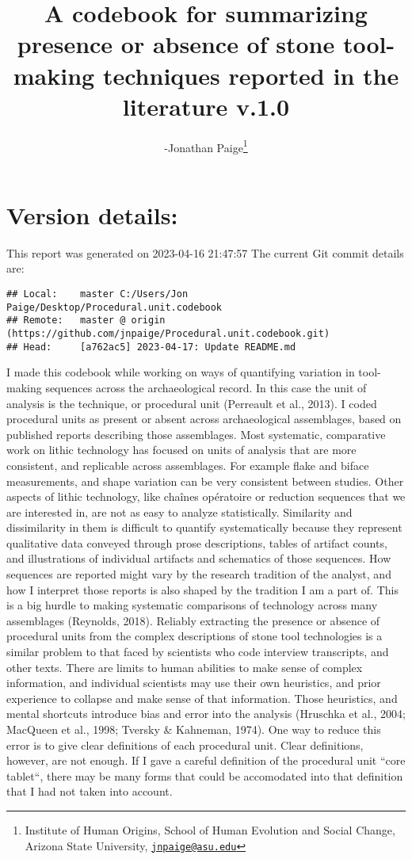\documentclass[
]{article}
\title{A codebook for summarizing presence or absence of stone
tool-making techniques reported in the literature v.1.0}
\author{-Jonathan Paige\footnote{Institute of Human Origins, School of
  Human Evolution and Social Change, Arizona State University,
  \href{mailto:jnpaige@asu.edu}{\nolinkurl{jnpaige@asu.edu}}}}
\date{}
\begin{document}
\maketitle

{
\setcounter{tocdepth}{3}
\tableofcontents
}
\hypertarget{version-details}{%
\section{Version details:}\label{version-details}}

This report was generated on 2023-04-16 21:47:57 The current Git commit
details are:

\begin{verbatim}
## Local:    master C:/Users/Jon Paige/Desktop/Procedural.unit.codebook
## Remote:   master @ origin (https://github.com/jnpaige/Procedural.unit.codebook.git)
## Head:     [a762ac5] 2023-04-17: Update README.md
\end{verbatim}

I made this codebook while working on ways of quantifying variation in
tool-making sequences across the archaeological record. In this case the
unit of analysis is the technique, or procedural unit (Perreault et al.,
2013). I coded procedural units as present or absent across
archaeological assemblages, based on published reports describing those
assemblages. Most systematic, comparative work on lithic technology has
focused on units of analysis that are more consistent, and replicable
across assemblages. For example flake and biface measurements, and shape
variation can be very consistent between studies. Other aspects of
lithic technology, like chaînes opératoire or reduction sequences that
we are interested in, are not as easy to analyze statistically.
Similarity and dissimilarity in them is difficult to quantify
systematically because they represent qualitative data conveyed through
prose descriptions, tables of artifact counts, and illustrations of
individual artifacts and schematics of those sequences. How sequences
are reported might vary by the research tradition of the analyst, and
how I interpret those reports is also shaped by the tradition I am a
part of. This is a big hurdle to making systematic comparisons of
technology across many assemblages (Reynolds, 2018). Reliably extracting
the presence or absence of procedural units from the complex
descriptions of stone tool technologies is a similar problem to that
faced by scientists who code interview transcripts, and other texts.
There are limits to human abilities to make sense of complex
information, and individual scientists may use their own heuristics, and
prior experience to collapse and make sense of that information. Those
heuristics, and mental shortcuts introduce bias and error into the
analysis (Hruschka et al., 2004; MacQueen et al., 1998; Tversky \&
Kahneman, 1974). One way to reduce this error is to give clear
definitions of each procedural unit. Clear definitions, however, are not
enough. If I gave a careful definition of the procedural unit ``core
tablet``, there may be many forms that could be accomodated into that
definition that I had not taken into account.
\end{document}
